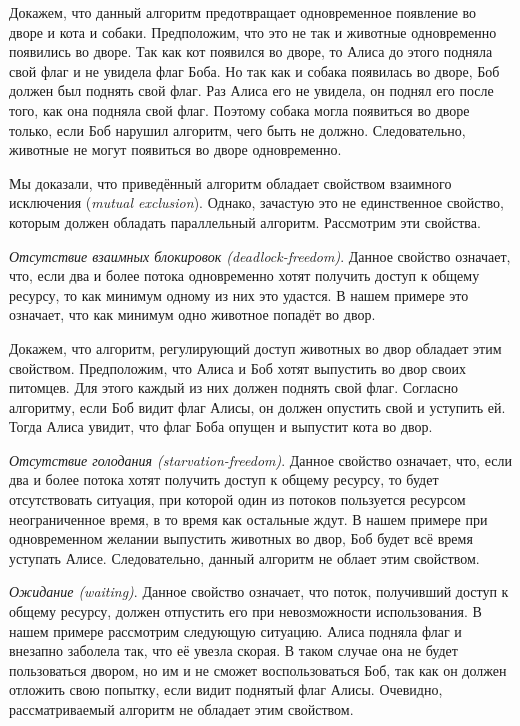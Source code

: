 Докажем, что данный алгоритм предотвращает одновременное появление во дворе и
кота и собаки. Предположим, что это не так и животные одновременно появились во
дворе. Так как кот появился во дворе, то Алиса до этого подняла свой флаг и не
увидела флаг Боба. Но так как и собака появилась во дворе, Боб должен был
поднять свой флаг. Раз Алиса его не увидела, он поднял его после того, как
она подняла свой флаг. Поэтому собака могла появиться во дворе только, если Боб
нарушил алгоритм, чего быть не должно. Следовательно, животные не могут
появиться во дворе одновременно.

Мы доказали, что приведённый алгоритм обладает свойством взаимного исключения
(\textit{mutual exclusion}). Однако, зачастую это не единственное свойство,
которым должен обладать параллельный алгоритм. Рассмотрим эти свойства.

\textit{Отсутствие взаимных блокировок (deadlock-freedom)}. Данное свойство
означает, что, если два и более потока одновременно хотят получить доступ к
общему ресурсу, то как минимум одному из них это удастся. В нашем примере это
означает, что как минимум одно животное попадёт во двор.

Докажем, что алгоритм, регулирующий доступ животных во двор обладает этим
свойством. Предположим, что Алиса и Боб хотят выпустить во двор своих питомцев.
Для этого каждый из них должен поднять свой флаг. Согласно алгоритму, если Боб
видит флаг Алисы, он должен опустить свой и уступить ей. Тогда Алиса увидит, что
флаг Боба опущен и выпустит кота во двор.

\textit{Отсутствие голодания (starvation-freedom)}. Данное свойство означает,
что, если два и более потока хотят получить доступ к общему ресурсу, то будет
отсутствовать ситуация, при которой один из потоков пользуется ресурсом
неограниченное время, в то время как остальные ждут. В нашем примере при
одновременном желании выпустить животных во двор, Боб будет всё время уступать
Алисе. Следовательно, данный алгоритм не облает этим свойством.

\textit{Ожидание (waiting)}. Данное свойство означает, что поток, получивший
доступ к общему ресурсу, должен отпустить его при невозможности использования.
В нашем примере рассмотрим следующую ситуацию. Алиса подняла флаг и внезапно
заболела так, что её увезла скорая. В таком случае она не будет пользоваться
двором, но им и не сможет воспользоваться Боб, так как он должен отложить свою
попытку, если видит поднятый флаг Алисы. Очевидно, рассматриваемый алгоритм не
обладает этим свойством.

